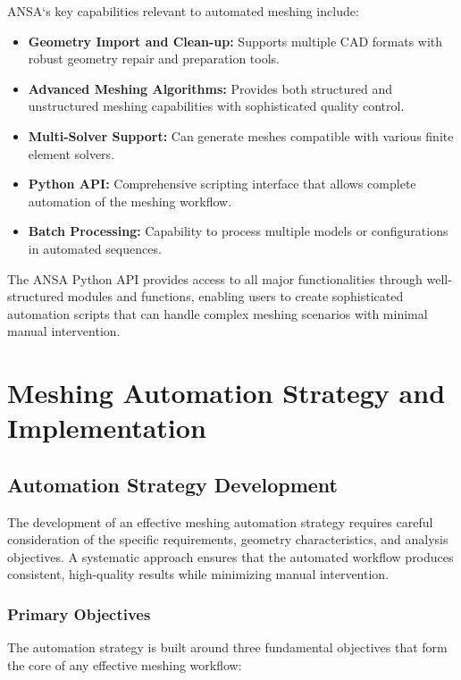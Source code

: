 \documentclass{book}
\begin{document}
\begin{itemize}[leftmargin=*,label=\textbullet]
ANSA`s key capabilities relevant to automated meshing include:
\begin{itemize}[leftmargin=*,label=\textbullet]
    \item \textbf{Geometry Import and Clean-up:} Supports multiple CAD formats with robust geometry repair and preparation tools.
    \item \textbf{Advanced Meshing Algorithms:} Provides both structured and unstructured meshing capabilities with sophisticated quality control.
    \item \textbf{Multi-Solver Support:} Can generate meshes compatible with various finite element solvers.
    \item \textbf{Python API:} Comprehensive scripting interface that allows complete automation of the meshing workflow.
    \item \textbf{Batch Processing:} Capability to process multiple models or configurations in automated sequences.
\end{itemize}

The ANSA Python API provides access to all major functionalities through well-structured modules and functions, enabling users to create sophisticated automation scripts that can handle complex meshing scenarios with minimal manual intervention.

\chapter{Meshing Automation Strategy and Implementation}

\section{Automation Strategy Development}

The development of an effective meshing automation strategy requires careful consideration of the specific requirements, geometry characteristics, and analysis objectives. A systematic approach ensures that the automated workflow produces consistent, high-quality results while minimizing manual intervention.

\subsection{Primary Objectives}

The automation strategy is built around three fundamental objectives that form the core of any effective meshing workflow:


\end{itemize}
\end{document}
